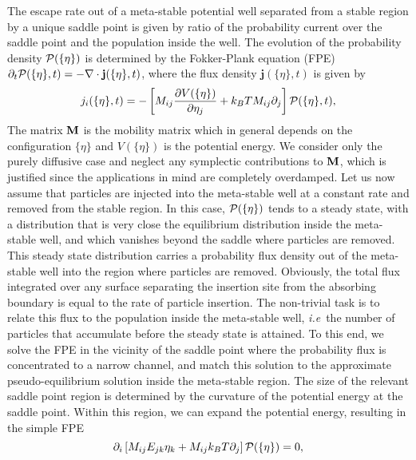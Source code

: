 The escape rate out of a meta-stable potential well separated from a stable region by a unique
saddle point is given by ratio of the probability current over the saddle point and the population 
inside the well. The evolution of the probability density ${\cal P}(\{\eta\})$ is determined by the 
Fokker-Plank equation (FPE) $\partial_t {\cal P}(\{\eta\},t)=-\nabla\cdot\mathbf{j}(\{\eta\},t)$, where the
flux density $\mathbf{j}(\{\eta\},t)$ is given by
\begin{equation}
\label{eq:FPE}
j_i (\{\eta\},t)= -\left[M_{ij}\frac{\partial V(\{\eta\})}{\partial \eta_j}+k_BTM_{ij} \partial_j \right]{\cal P}(\{\eta\},t),
\end{equation}
The matrix $\mathbf{M}$ is the mobility matrix which in general depends on the configuration 
$\{\eta\}$ and $V(\{\eta\})$ is the potential energy.
We consider only the purely diffusive case and neglect any symplectic contributions to $\mathbf{M}$, 
which is justified since the applications in mind are completely overdamped.
Let us now assume that particles are injected into the meta-stable well at a constant rate and removed
from the stable region. In this case, ${\cal P}(\{\eta\})$ tends to a steady state, with a distribution that is very close
the equilibrium distribution inside the meta-stable well, and which vanishes beyond the saddle where particles are
removed. This steady state distribution carries a probability flux density out of the meta-stable well into the
region where particles are removed. Obviously, the total flux integrated over any surface separating the insertion site from the absorbing boundary is equal to the rate of particle insertion. The non-trivial task 
is to relate this flux to the population inside the meta-stable well, \emph{i.e}~the number of 
particles that accumulate before the steady state is attained. To this end, we solve the FPE in the vicinity
of the saddle point where the probability flux is concentrated to a narrow channel, and
match this solution to the approximate pseudo-equilibrium solution inside the meta-stable region.
The size of the relevant saddle point region is determined by the curvature of the potential 
energy at the saddle point. Within this region, we can expand the potential 
energy, resulting in the simple FPE
\begin{equation}
\label{eq:steadyFPE}
\partial_i \left[M_{ij}E_{jk}\eta_k+M_{ij}k_BT \partial_j \right]{\cal P}(\{\eta\}) =0,
\end{equation}
